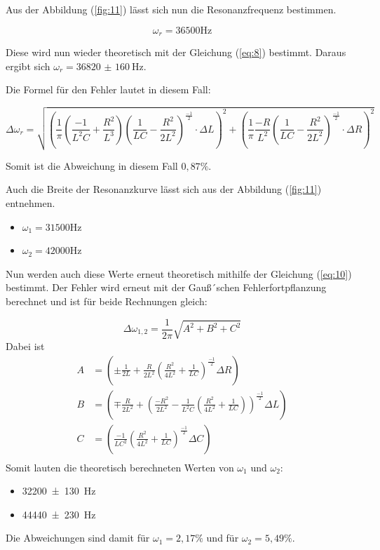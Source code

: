 Aus der Abbildung (\ref{fig:11}) lässt sich nun die Resonanzfrequenz bestimmen.

\begin{equation*}
  \omega_r = 36500 \si{\Hz}
\end{equation*}

Diese wird nun wieder theoretisch mit der Gleichung (\ref{eq:8}) bestimmt. Daraus ergibt sich
$\omega_r = \SI{36820(160)}{\Hz}$.

Die Formel für den Fehler lautet in diesem Fall:

\begin{equation*}
  \Delta \omega_r = \sqrt{\left( \frac{1}{\pi}\left( \frac{-1}{L^2C} + \frac{R^2}{L^3}\right)
  \left(\frac{1}{LC} - \frac{R^2}{2L^2}\right)^{\frac{-1}{2}} \cdot \Delta L\right)^2 +
  \left(\frac{1}{\pi} \frac{-R}{L^2} \left(\frac{1}{LC} - \frac{R^2}{2L^2}\right)^{\frac{-1}{2}} \cdot \Delta R \right)^2 }
\end{equation*}

Somit ist die Abweichung in diesem Fall $0,87 \% $.

Auch die Breite der Resonanzkurve lässt sich aus der Abbildung (\ref{fig:11}) entnehmen.

\begin{itemize}
  \item $\omega_1 = 31500 \si{\Hz}$
  \item $\omega_2 = 42000 \si{\Hz}$
\end{itemize}

Nun werden auch diese Werte erneut theoretisch mithilfe der Gleichung (\ref{eq:10}) bestimmt.
Der Fehler wird erneut mit der Gauß´schen Fehlerfortpflanzung berechnet und ist für beide
Rechnungen gleich:

\begin{equation*}
  \Delta \omega_{1,2} = \frac{1}{2\pi} \sqrt{A^2 + B^2 + C^2}
\end{equation*}
Dabei ist
\begin{align*}
  A &= \left(\pm \frac{1}{2L} + \frac{R}{2L^2}
  \left(\frac{R^2}{4L^2}+\frac{1}{LC}\right)^{\frac{-1}{2}} \Delta R\right) \\
  B &= \left(\mp \frac{R}{2L^2} + \left( \frac{-R^2}{2L^2} - \frac{1}{L^2C} \left(\frac{R^2}{4L^2}+
  \frac{1}{LC}\right)\right)^{\frac{-1}{2}} \Delta L\right) \\
  C &= \left(\frac{-1}{LC^2} \left(\frac{R^2}{4L^2}+
  \frac{1}{LC}\right)^{\frac{-1}{2}} \Delta C\right) \\
\end{align*}
Somit lauten die theoretisch berechneten Werten von $\omega_1$ und $\omega_2$:

\begin{itemize}
  \item \SI{32200(130)}{\Hz}
  \item \SI{44440(230)}{\Hz}
\end{itemize}

Die Abweichungen sind damit für $\omega_1 = 2,17 \% $ und für $\omega_2 = 5,49 \% $.
